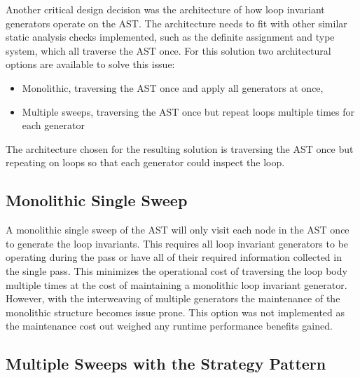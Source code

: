 Another critical design decision was the architecture of how loop invariant
generators operate on the AST.
The architecture needs to fit with other similar static analysis checks
implemented, such as the definite assignment and type system, which all
traverse the AST once.
For this solution two architectural options are available to solve this issue:

\begin{itemize}
	\item{Monolithic, traversing the AST once and apply all generators at once,}
	\item{Multiple sweeps, traversing the AST once but repeat loops multiple times for each generator}
\end{itemize}

The architecture chosen for the resulting solution is  traversing the AST once
but repeating on loops so that each generator could inspect the loop.

\subsection{Monolithic Single Sweep}

A monolithic single sweep of the AST will only visit each
node in the AST once to generate the loop invariants.
This requires all loop invariant generators to be operating
during the pass or have all of their required information collected
in the single pass.
This minimizes the operational cost of traversing the loop body
multiple times at the cost of maintaining a monolithic loop invariant generator.
However, with the interweaving of multiple generators the maintenance of the
monolithic structure becomes issue prone.
This option was not implemented as the maintenance cost out weighed any
runtime performance benefits gained.



\subsection{Multiple Sweeps with the Strategy Pattern}

